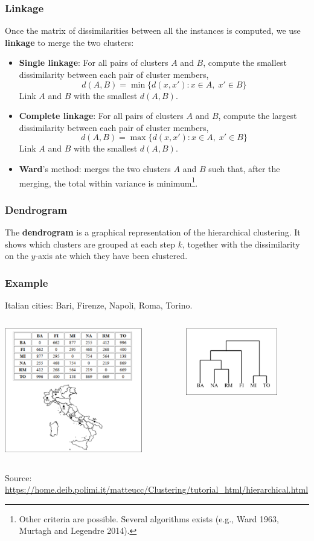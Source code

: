 \begin{frame}
\frametitle{Linkage}
Once the matrix of dissimilarities between all the instances is computed, we use {\bf linkage} to merge the two clusters:
\small
\begin{itemize}
\item {\bf Single linkage}: For all pairs of clusters $A$ and $B$, compute the smallest dissimilarity between each pair of cluster members,
$$
d(A,B) = \min \{d(x,x'): x\in A,\; x' \in B\}
$$
Link $A$ and $B$ with the smallest $d(A,B)$.
\item {\bf Complete linkage}: For all pairs of clusters $A$ and $B$, compute the largest dissimilarity between each pair of cluster members,
$$
d(A,B) = \max \{d(x, x'): x\in A,\; x' \in B\}
$$
Link $A$ and $B$ with the smallest $d(A,B)$.
\item {\bf Ward}'s method: merges the two clusters $A$ and $B$ such that, after the merging, the total within variance is minimum\footnote{Other criteria are possible. Several algorithms exists (e.g., Ward 1963, Murtagh and Legendre 2014).}.
\end{itemize}
\normalsize
\end{frame}
\begin{frame}
\frametitle{Dendrogram}
The {\bf dendrogram} is a graphical representation of the hierarchical clustering. It shows
which clusters are grouped at each step $k$, together with the dissimilarity on the $y$-axis ate which they have been clustered.
\end{frame}
\begin{frame}
\frametitle{Example}
Italian cities: Bari, Firenze, Napoli, Roma, Torino.
\begin{center}
\begin{columns}
\begin{column}{0.6\textwidth}
\includegraphics[width=6cm]{../../Graphs/Italy1.png}
\end{column}
\begin{column}{0.4\textwidth}
\includegraphics[width=4cm]{../../Graphs/Italy2.png}
\end{column}
\end{columns}
\end{center}
\tiny
Source: \url{https://home.deib.polimi.it/matteucc/Clustering/tutorial_html/hierarchical.html}
\normalsize
\end{frame}
